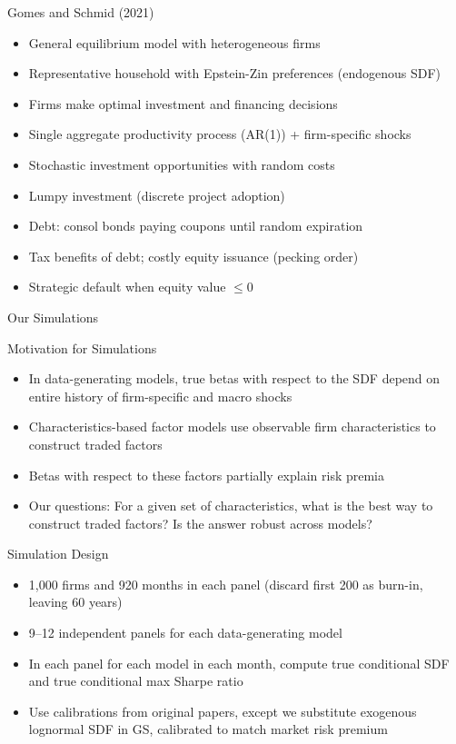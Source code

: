 \documentclass[aspectratio=169]{beamer}
\begin{document}
\begin{frame}{Gomes and Schmid (2021)}
\begin{itemize}
  \item General equilibrium model with heterogeneous firms
  \item Representative household with Epstein-Zin preferences (endogenous SDF)
  \item Firms make optimal investment and financing decisions
  \item Single aggregate productivity process (AR(1)) + firm-specific shocks
  \item Stochastic investment opportunities with random costs
  \item Lumpy investment (discrete project adoption)
  \item Debt: consol bonds paying coupons until random expiration
  \item Tax benefits of debt; costly equity issuance (pecking order)
  \item Strategic default when equity value $\leq 0$
\end{itemize}
\end{frame}


\begin{frame}[c]
  \centering
  \Huge Our Simulations
\end{frame}

\begin{frame}{Motivation for Simulations}
\begin{itemize}
\item In data-generating models, true betas with respect to the SDF depend on entire history of firm-specific and macro shocks
\item Characteristics-based factor models use observable firm characteristics to construct traded factors
\item Betas with respect to these factors partially explain risk premia
\item Our questions: For a given set of characteristics, what is the best way to construct traded factors?  Is the answer robust across models?
\end{itemize}
\end{frame}

\begin{frame}{Simulation Design}
\begin{itemize}
  \item 1,000 firms and 920 months in each panel (discard first 200 as burn-in, leaving 60 years)
  \item 9--12 independent panels for each data-generating model
  \item In each panel for each model in each month, compute true conditional SDF and true conditional max Sharpe ratio
  \item Use calibrations from original papers, except we substitute exogenous lognormal SDF in GS, calibrated to match market risk premium
\end{itemize}
\end{frame}
\end{document}
